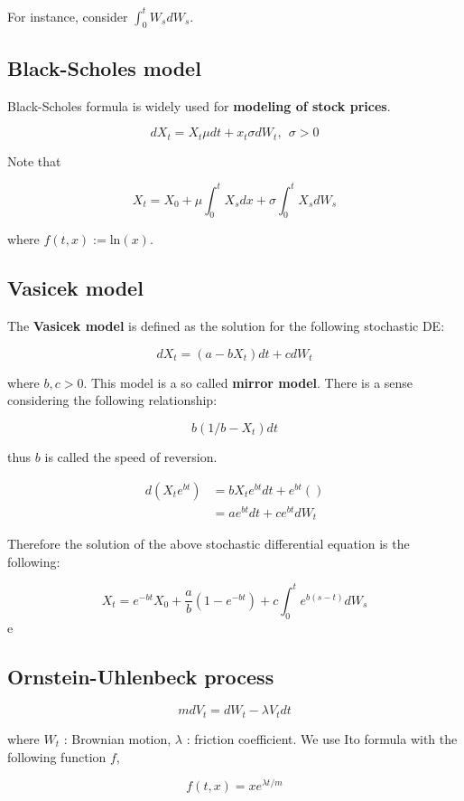 \documentclass[12pt]{article}
\theoremstyle{nonumberbreak}
\begin{document}
For instance, consider $\int_0^t W_s dW_s$.


\subsection{Black-Scholes model}

Black-Scholes formula is widely used for \textbf{modeling of stock prices}.

$$
dX_t = X_t \mu dt + x_t \sigma dW_t, \ \ \sigma >0
$$

Note that

$$
X_t = X_0 + \mu \int_0^t X_s dx + \sigma \int_0^t X_s dW_s
$$

where $f(t,x) := \mathrm{ln}(x)$. 


\subsection{Vasicek model}

The \textbf{Vasicek model} is defined as the solution for the following stochastic DE:

$$
dX_t = (a - b X_t) dt + c dW_t
$$

where $b,c > 0$. This model is a so called \textbf{mirror model}. There is a sense considering the following relationship:

$$
b\left( 1/b - X_t \right) dt
$$

thus $b$ is called the speed of reversion. 

$$
\begin{aligned}
d \left( X_t e^{bt} \right) &= b X_t e^{bt} dt + e^{bt} \left( \right) \\[8pt]
&= ae^{bt} dt + ce^{bt} dW_t
\end{aligned}
$$

Therefore the solution of the above stochastic differential equation is the following:

$$
X_t = e^{-bt} X_0 + \frac{a}{b} (1-e^{-bt}) + c\int_0^t e^{b(s-t)} dW_s
$$e


\subsection{Ornstein-Uhlenbeck process}

$$
m dV_t = dW_t - \lambda V_t dt
$$

where $W_t$ : Brownian motion, $\lambda$ : friction coefficient. We use Ito formula with the following function $f$,

$$
f(t,x) = x e^{\lambda t/m}
$$
\end{document}
